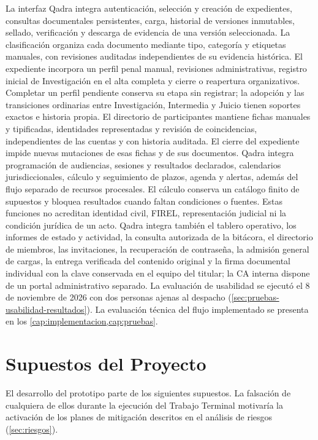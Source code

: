 La interfaz Qadra integra autenticación, selección y creación de expedientes,
consultas documentales persistentes, carga, historial de versiones inmutables,
sellado, verificación y descarga de evidencia de una versión seleccionada.
La clasificación organiza cada documento mediante tipo, categoría y etiquetas
manuales, con revisiones auditadas independientes de su evidencia histórica.
El expediente incorpora un perfil penal manual, revisiones administrativas,
registro inicial de Investigación en el alta completa y cierre o reapertura
organizativos. Completar un perfil pendiente conserva su etapa sin registrar;
la adopción y las transiciones ordinarias entre Investigación, Intermedia y
Juicio tienen soportes exactos e historia propia. El directorio de participantes
mantiene fichas manuales y tipificadas, identidades representadas y revisión de
coincidencias, independientes de las cuentas y con historia auditada. El cierre
del expediente impide nuevas mutaciones de esas fichas y de sus documentos.
Qadra integra programación de audiencias, sesiones y resultados declarados,
calendarios jurisdiccionales, cálculo y seguimiento de plazos, agenda y alertas,
además del flujo separado de recursos procesales. El cálculo conserva un
catálogo finito de supuestos y bloquea resultados cuando faltan condiciones o
fuentes. Estas funciones no acreditan identidad civil, FIREL, representación
judicial ni la condición jurídica de un acto. Qadra integra también el tablero
operativo, los informes de estado y actividad, la consulta autorizada de la
bitácora, el directorio de miembros, las invitaciones, la recuperación de
contraseña, la admisión general de cargas, la entrega verificada del contenido
original y la firma documental individual con la clave conservada en el equipo
del titular; la CA interna dispone de un portal administrativo separado.
La evaluación de usabilidad se ejecutó el 8 de noviembre de 2026 con dos
personas ajenas al despacho (\cref{sec:pruebas-usabilidad-resultados}).
La evaluación técnica del flujo implementado se presenta en
los \cref{cap:implementacion,cap:pruebas}.

\section{Supuestos del Proyecto}\label{sec:supuestos}

El desarrollo del prototipo parte de los siguientes supuestos. La falsación de cualquiera de ellos durante la ejecución del Trabajo Terminal motivaría la activación de los planes de mitigación descritos en el análisis de riesgos (\cref{sec:riesgos}).

